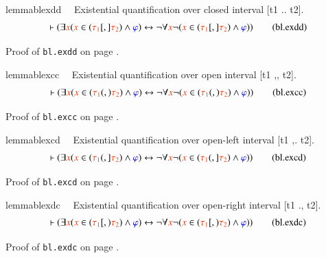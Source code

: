 
\begin{restatable}{lemma}{blexdd}~~ Existential quantification over closed
interval [t1 .. t2].
\begin{align}
\vdash ( \exists \msc{x} ( \msc{x} \in ( \msc{\tau_1} [,] \msc{\tau_2} ) \wedge
    \mw{\varphi} ) \leftrightarrow \lnot \forall \msc{x} \lnot ( \msc{x} \in (
    \msc{\tau_1} [,] \msc{\tau_2} ) \wedge \mw{\varphi} )
    )\label{eq:bl.exdd}\tag{bl.exdd}
\end{align}
\end{restatable}
Proof of {\tt bl.exdd} on page \pageref{proof:bl.exdd}.

\begin{restatable}{lemma}{blexcc}~~ Existential quantification over open
interval [t1 ,, t2].
\begin{align}
\vdash ( \exists \msc{x} ( \msc{x} \in ( \msc{\tau_1} (,) \msc{\tau_2} ) \wedge
    \mw{\varphi} ) \leftrightarrow \lnot \forall \msc{x} \lnot ( \msc{x} \in (
    \msc{\tau_1} (,) \msc{\tau_2} ) \wedge \mw{\varphi} )
    )\label{eq:bl.excc}\tag{bl.excc}
\end{align}
\end{restatable}
Proof of {\tt bl.excc} on page \pageref{proof:bl.excc}.

\begin{restatable}{lemma}{blexcd}~~ Existential quantification over open-left
interval [t1 ,. t2].
\begin{align}
\vdash ( \exists \msc{x} ( \msc{x} \in ( \msc{\tau_1} (,] \msc{\tau_2} ) \wedge
    \mw{\varphi} ) \leftrightarrow \lnot \forall \msc{x} \lnot ( \msc{x} \in (
    \msc{\tau_1} (,] \msc{\tau_2} ) \wedge \mw{\varphi} )
    )\label{eq:bl.excd}\tag{bl.excd}
\end{align}
\end{restatable}
Proof of {\tt bl.excd} on page \pageref{proof:bl.excd}.

\begin{restatable}{lemma}{blexdc}~~ Existential quantification over open-right
interval [t1 ., t2].
\begin{align}
\vdash ( \exists \msc{x} ( \msc{x} \in ( \msc{\tau_1} [,) \msc{\tau_2} ) \wedge
    \mw{\varphi} ) \leftrightarrow \lnot \forall \msc{x} \lnot ( \msc{x} \in (
    \msc{\tau_1} [,) \msc{\tau_2} ) \wedge \mw{\varphi} )
    )\label{eq:bl.exdc}\tag{bl.exdc}
\end{align}
\end{restatable}
Proof of {\tt bl.exdc} on page \pageref{proof:bl.exdc}.

